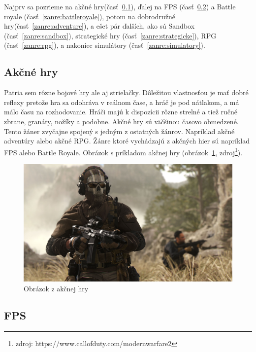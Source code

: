\documentclass[10pt,oneside,slovak,a4paper]{article}
\begin{document}
Najprv sa pozrieme na akčné hry(časť~\ref{zanre:akcne}), ďalej na FPS (časť~\ref{zanre:fps}) a Battle royale (časť~\ref{zanre:battleroyale}), potom na dobrodružné hry(časť~\ref{zanre:adventure}), a ešet pár ďalších, ako sú Sandbox (časť~\ref{zanre:sandbox}), strategické hry (časť~\ref{zanre:strategicke}), RPG (časť~\ref{zanre:rpg}), a nakoniec simulátory (časť~\ref{zanre:simulatory}).

\subsection{Akčné hry} \label{zanre:akcne}

Patria sem rôzne bojové hry ale aj strielačky. Dôležitou vlastnosťou je mať dobré reflexy pretože hra sa odohráva v reálnom čase, a hráč je pod nátlakom, a má málo času na rozhodovanie. Hráči majú k dispozícii rôzne strelné a tiež ručné zbrane, granáty, nožíky a podobne. Akčné hry sú väčšinou časovo obmedzené. Tento žáner zvyčajne spojený s jedným z ostatných žánrov. Napríklad akčné adventúry alebo akčné RPG. Žánre ktoré vychádzajú z akčných hier sú napríklad FPS alebo Battle Royale. Obrázok s príkladom akčnej hry (obrázok~\ref{f:akcne}, zdroj\footnote{zdroj: https://www.callofduty.com/modernwarfare2}).

\begin{figure}[tbh]
\centering
\includegraphics[scale=0.1]{mw2.jpg}
\caption{Obrázok z akčnej hry}
\label{f:akcne}
\end{figure}



\subsection{FPS} \label{zanre:fps}
\end{document}
